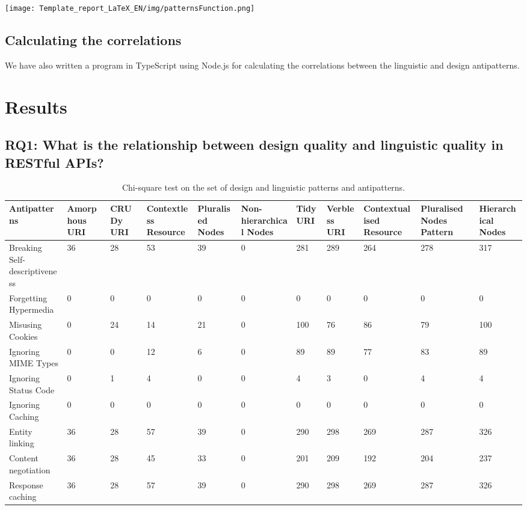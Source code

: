 \documentclass[a4paper,12pt]{article}
\begin{document}
\begin{center}
\texttt{[image: Template\_report\_LaTeX\_EN/img/patternsFunction.png]}
\end{center}

\subsection{Calculating the correlations}

We have also written a program in TypeScript using Node.js for calculating the correlations between the linguistic and design antipatterns. 

\newpage

\section{Results}

\subsection{\textbf{RQ1:} What is the relationship between design quality and linguistic quality in RESTful APIs?}

\begin{table}[ht!]
\scriptsize
\begin{tabular}{|p{15mm}|p{9mm}|p{9mm}|p{9mm}|p{9mm}|p{9mm}|p{9mm}|p{9mm}|p{9mm}|p{9mm}|p{9mm}|}
\hline Antipatterns & Amor\-phous URI & CRUDy URI & Context\-less Resource & Pluralised Nodes& Non-hiera\-rchical Nodes & Tidy URI & Verbless URI & Context\-ualised Resource & Pluralised Nodes Pattern& Hierar\-chical Nodes  \\
\hline 
 Breaking Self-descriptiveness &
 36 &
 28 &
 53 &
 39 &
 0 &
 281 &
 289 &
 264 &
 278 &
 317
\\ \hline
 Forgetting Hypermedia &
 0 &
 0 &
 0 &
 0 &
 0 &
 0 &
 0 &
 0 &
 0 &
 0
\\ \hline
 Misusing Cookies &
 0 &
 24 &
 14 &
 21 &
 0 &
 100 &
 76 &
 86 &
 79 &
 100
\\ \hline
Ignoring MIME Types &
 0 &
 0 &
 12 &
 6 &
 0 &
 89 &
 89 &
 77 &
 83 &
 89
\\ \hline
Ignoring Status Code &
 0 &
 1 &
 4 &
 0 &
 0 &
 4 &
 3 &
 0 &
 4 &
 4
\\ \hline
Ignoring Caching &
 0 &
 0 &
 0 &
 0 &
 0 &
 0 &
 0 &
 0 &
 0 &
 0
\\ \hline
Entity linking &
 36 &
 28 &
 57 &
 39 &
 0 &
 290 &
 298 &
 269 &
 287 &
 326
\\ \hline
Content negotiation &
 36 &
 28 &
 45 &
 33 &
 0 &
 201 &
 209 &
 192 &
 204 &
 237
\\ \hline
Response caching &
 36 &
 28 &
 57 &
 39 &
 0 &
 290 &
 298 &
 269 &
 287 &
 326
\\ \hline
\end{tabular}

\caption{Chi-square test on the set of design and linguistic patterns and antipatterns.}
\label{Chi-square test}
\end{table}
\end{document}
